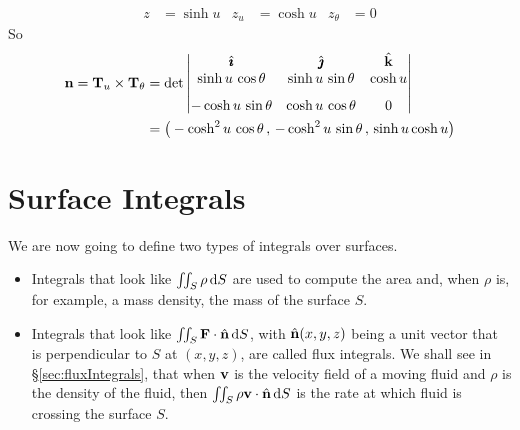 \begin{eg}
\begin{align*}
%
z&=\sinh u &
z_u&=\cosh u &
z_\theta&=0
\end{align*}
So
\begin{align*}
\mathbf{n} = \mathbf{T}_u\times\mathbf{T}_\theta
&=\det\left|\begin{matrix}
            \hat{\pmb{\imath}} &  \hat{\pmb{\jmath}} & \hat{\mathbf{k}} \\
            \sinh u\,\cos\theta &
               \sinh u\,\sin\theta &
               \cosh u \\[0.1in]
           -\cosh u\,\sin\theta  &
            \cosh u\,\cos\theta &
             0
           \end{matrix}\right| \\
&=\big(-\cosh^2u\,\cos\theta\,,\,
       -\cosh^2u\,\sin\theta\,,\,
       \sinh u\cosh u\big)
\end{align*}
\end{eg}


\section{Surface Integrals}\label{sec:surfaceIntegrals}

We are now going to define two types of integrals over surfaces.
\begin{itemize}
\item[$\circ$]
  Integrals that look like $\iint_S \rho\,\mathrm{d}S$ are used to
compute the area and, when $\rho$ is, for example, a mass density,
the mass of the surface $S$.
\item[$\circ$]
  Integrals that look like $\iint_S \mathbf{F}\cdot\hat{\mathbf{n}}\,\mathrm{d}S$,
with $\hat{\mathbf{n}}(x,y,z)$ being a unit vector that is perpendicular to 
$S$ at $(x,y,z)$,  are called
flux integrals. We shall see in \S\ref{sec:fluxIntegrals}, that when
$\mathbf{v}$ is the velocity field of a moving fluid and $\rho$ is the density
of the fluid, then $\iint_S \rho\mathbf{v}\cdot\hat{\mathbf{n}}\,\mathrm{d}S$ is the rate at which
fluid is crossing the surface $S$.
\end{itemize}

